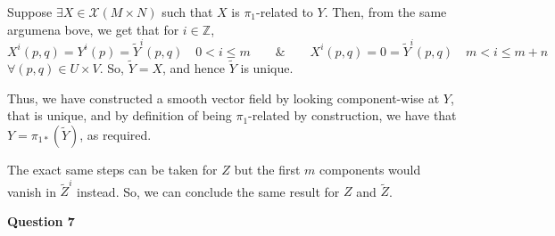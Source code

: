 \documentclass[10pt]{article}
\newcommand{\Z}{\mathbb{Z}}
\begin{document}
Suppose $\exists X\in \mathcal{X}(M\times N)$ such that $X$ is $\pi_{1}$-related to $Y$. Then, from the same argumena bove, we get that for $i\in \Z$,
\[ X^{i}(p,q) = Y^{i}(p) = \tilde{Y}^{i}(p,q) \hspace{1em} 0 < i \leq m \hspace{2em} \&\hspace{2em} X^{i}(p,q) = 0 = \tilde{Y}^{i}(p,q) \hspace{1em} m < i \leq m+n\]
$\forall (p,q)\in U\times V$. So, $\tilde{Y} = X$, and hence $\tilde{Y}$ is unique.

Thus, we have constructed a smooth vector field by looking component-wise at $Y$, that is unique, and by definition of being $\pi_{1}$-related by construction, we have that $Y = \pi_{1*}(\tilde{Y})$, as required.

The exact same steps can be taken for $Z$ but the first $m$ components would vanish in $\tilde{Z}^{i}$ instead. So, we can conclude the same result for $Z$ and $\tilde{Z}$.

\newpage
\textbf{Question 7}
\end{document}
